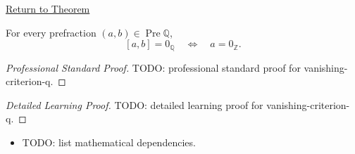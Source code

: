 \newpage
{}
\label{prf:vanishing-criterion-q}

\begin{remark*}[Return]
\hyperref[lem:vanishing-criterion-q]{Return to Theorem}
\end{remark*}

\begin{lemma*}
For every prefraction $(a,b)\in\operatorname{Pre}\mathbb{Q}$,
\[
[a,b]=0_{\mathbb{Q}}
\quad\Longleftrightarrow\quad
a=0_{\mathbb{Z}}.
\]
\end{lemma*}

\begin{proof}[Professional Standard Proof]
\LRAProofBodyStart
TODO: professional standard proof for vanishing-criterion-q.
\end{proof}

\begin{proof}[Detailed Learning Proof]
\LRAProofBodyStart
TODO: detailed learning proof for vanishing-criterion-q.
\end{proof}

\begin{remark*}
\end{remark*}

\begin{dependencies}
\begin{itemize}
  \item TODO: list mathematical dependencies.
\end{itemize}
\end{dependencies}

\clearpage
